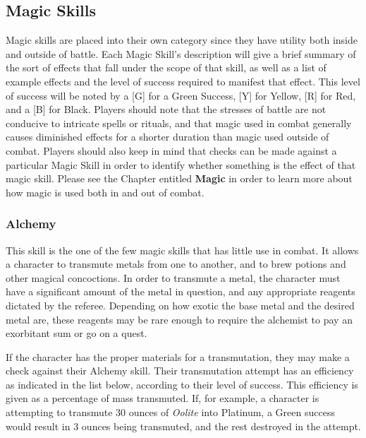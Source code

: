 \documentclass[oneside]{book}
\begin{document}
\begin{multicols}{2}
\section{Magic Skills}
Magic skills are placed into their own category since they have utility both inside and outside of battle. Each Magic Skill's description will give a brief summary of the sort of effects that fall under the scope of that skill, as well as a list of example effects and the level of success required to manifest that effect. This level of success will be noted by a [G] for a Green Success, [Y] for Yellow, [R] for Red, and a [B] for Black. Players should note that the stresses of battle are not conducive to intricate spells or rituals, and that magic used in combat generally causes diminished effects for a shorter duration than magic used outside of combat. Players should also keep in mind that checks can be made against a particular Magic Skill in order to identify whether something is the effect of that magic skill. Please see the Chapter entitled \textbf{Magic} in order to learn more about how magic is used both in and out of combat. 

\subsubsection{Alchemy}
This skill is the one of the few magic skills that has little use in combat. It allows a character to transmute metals from one to another, and to brew potions and other magical concoctions. In order to transmute a metal, the character must have a significant amount of the metal in question, and any appropriate reagents dictated by the referee. Depending on how exotic the base metal and the desired metal are, these reagents may be rare enough to require the alchemist to pay an exorbitant sum or go on a quest.

If the character has the proper materials for a transmutation, they may make a check against their Alchemy skill. Their transmutation attempt has an efficiency as indicated in the list below, according to their level of success. This efficiency is given as a percentage of mass transmuted. If, for example, a character is attempting to transmute 30 ounces of \emph{Oolite} into Platinum, a Green success would result in 3 ounces being transmuted, and the rest destroyed in the attempt. 


\end{multicols}
\end{document}
